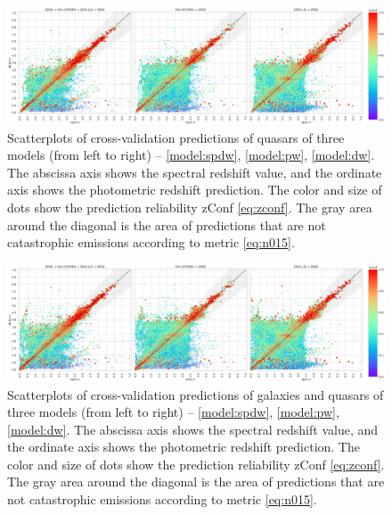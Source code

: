 \documentclass[fleqn,usenatbib]{mnras}
\begin{document}
\begin{figure}
    \centering
    \includegraphics[width=0.9\linewidth]{images/scatterplots-cv2-qso.png}
    \caption{Scatterplots of cross-validation predictions of quasars of three models (from left to right) -- \ref{model:spdw}, \ref{model:pw}, \ref{model:dw}. The abscissa axis shows the spectral redshift value, and the ordinate axis shows the photometric redshift prediction. The color and size of dots show the prediction reliability zConf \eqref{eq:zconf}. The gray area around the diagonal is the area of predictions that are not catastrophic emissions according to metric \eqref{eq:n015}.}
    \label{fig:metrics-cv2-qso}
\end{figure}

\begin{figure}
    \centering
    \includegraphics[width=0.9\linewidth]{images/scatterplots-cv2-total.png}
    \caption{Scatterplots of cross-validation predictions of galaxies and quasars of three models (from left to right) -- \ref{model:spdw}, \ref{model:pw}, \ref{model:dw}. The abscissa axis shows the spectral redshift value, and the ordinate axis shows the photometric redshift prediction. The color and size of dots show the prediction reliability zConf \eqref{eq:zconf}. The gray area around the diagonal is the area of predictions that are not catastrophic emissions according to metric \eqref{eq:n015}.}
    \label{fig:my_label}
\end{figure}
\end{document}
